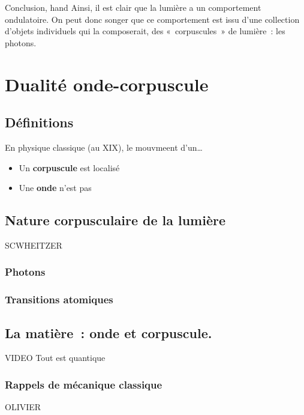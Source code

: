 \documentclass[../main/main.tex]{subfiles}
\begin{document}
\begin{tror}{Conclusion, hand}
	Ainsi, il est clair que la lumière a un comportement ondulatoire. On peut donc
	songer que ce comportement est issu d'une collection d'objets individuels qui
	la composerait, des «~corpuscules~» de lumière~: les photons.
\end{tror}

\section{Dualité onde-corpuscule}
\label{sec:dualondcorp}

\subsection{Définitions}
\label{ssec:docdef}
\noindent
\begin{minipage}[t]{.45\linewidth}
	En physique classique (au \textsc{XIX}\ieme), le mouvmeent d'un…
	\begin{itemize}
		\item Un \textbf{corpuscule} est localisé
		\item Une \textbf{onde} n'est pas
	\end{itemize}

\end{minipage}
\hfill


\subsection{Nature corpusculaire de la lumière}
\label{ssec:lumcorp}
SCWHEITZER
\subsubsection{Photons}
\label{sssec:photons}
\subsubsection{Transitions atomiques}
\label{sssec:transatom}

\subsection{La matière~: onde et corpuscule.}
\label{ssec:matonde}

VIDEO Tout est quantique
\subsubsection{Rappels de mécanique classique}
\label{sssec:rapmeca}
OLIVIER
\end{document}
